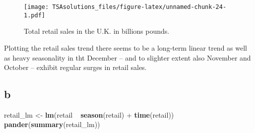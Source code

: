 \documentclass[]{book}
\newenvironment{Shaded}{\begin{snugshade}}{\end{snugshade}}
\newcommand{\KeywordTok}[1]{\textcolor[rgb]{0.13,0.29,0.53}{\textbf{{#1}}}}
\newcommand{\StringTok}[1]{\textcolor[rgb]{0.31,0.60,0.02}{{#1}}}
\newcommand{\NormalTok}[1]{{#1}}
\theoremstyle{definition}
\theoremstyle{definition}
\theoremstyle{remark}
\begin{document}
\begin{figure}[htbp]
\centering
\texttt{[image: TSAsolutions\_files/figure-latex/unnamed-chunk-24-1.pdf]}
\caption{\label{fig:unnamed-chunk-24}Total retail sales in the U.K. in
billions pounds.}
\end{figure}

Plotting the retail sales trend there seems to be a long-term linear
trend as well as heavy seasonality in tht December -- and to slighter
extent also November and October -- exhibit regular surges in retail
sales.

\subsection*{b}\label{b-25}

\begin{Shaded}
\begin{Highlighting}[]
\NormalTok{retail_lm <-}\StringTok{ }\KeywordTok{lm}\NormalTok{(retail ~}\StringTok{ }\KeywordTok{season}\NormalTok{(retail) +}\StringTok{ }\KeywordTok{time}\NormalTok{(retail))}
\KeywordTok{pander}\NormalTok{(}\KeywordTok{summary}\NormalTok{(retail_lm))}
\end{Highlighting}
\end{Shaded}
\end{document}

